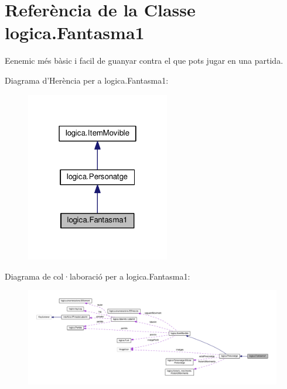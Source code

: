 \hypertarget{classlogica_1_1_fantasma1}{\section{Referència de la Classe logica.\+Fantasma1}
\label{classlogica_1_1_fantasma1}
}


Eenemic més bàsic i facil de guanyar contra el que pots jugar en una partida.  




Diagrama d'Herència per a logica.\+Fantasma1\+:\nopagebreak
\begin{figure}[H]
\begin{center}
\leavevmode
\includegraphics[width=178pt]{classlogica_1_1_fantasma1__inherit__graph}
\end{center}
\end{figure}


Diagrama de col·laboració per a logica.\+Fantasma1\+:
\nopagebreak
\begin{figure}[H]
\begin{center}
\leavevmode
\includegraphics[width=350pt]{classlogica_1_1_fantasma1__coll__graph}
\end{center}
\end{figure}
